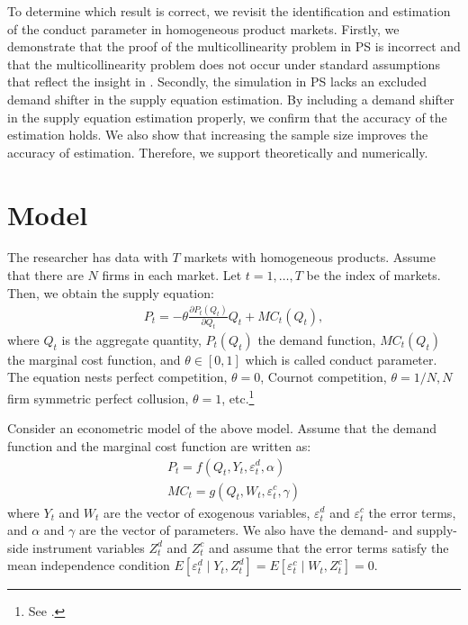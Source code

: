 \documentclass[11pt, a4paper]{article}
\begin{document}
To determine which result is correct, we revisit the identification and estimation of the conduct parameter in homogeneous product markets. 
Firstly, we demonstrate that the proof of the multicollinearity problem in PS is incorrect and that the multicollinearity problem does not occur under standard assumptions that reflect the insight in \cite{bresnahan1982oligopoly}.
Secondly, the simulation in PS lacks an excluded demand shifter in the supply equation estimation. 
By including a demand shifter in the supply equation estimation properly, we confirm that the accuracy of the estimation holds. 
We also show that increasing the sample size improves the accuracy of estimation. 
Therefore, we support \cite{bresnahan1982oligopoly} theoretically and numerically.


\section{Model}
The researcher has data with $T$ markets with homogeneous products.
Assume that there are $N$ firms in each market.
Let $t = 1,\ldots, T$ be the index of markets.
Then, we obtain the supply equation:
\begin{align}
     P_t = -\theta\frac{\partial P_t(Q_{t})}{\partial Q_{t}}Q_{t} + MC_t(Q_{t}),\label{eq:supply_equation}
\end{align}
where $Q_{t}$ is the aggregate quantity, $P_t(Q_{t})$ the demand function, $MC_{t}(Q_{t})$ the marginal cost function, and $\theta\in[0,1]$ which is called conduct parameter. 
The equation nests perfect competition, $\theta=0$, Cournot competition, $\theta=1/N, N$ firm symmetric perfect collusion, $\theta=1$, etc.\footnote{See \cite{bresnahan1982oligopoly}.} 

Consider an econometric model of the above model.
Assume that the demand function and the marginal cost function are written as: 
\begin{align}
    P_t = f(Q_{t}, Y_t, \varepsilon^{d}_{t}, \alpha) \label{eq:demand}\\
    MC_t = g(Q_{t}, W_{t}, \varepsilon^{c}_{t}, \gamma)\label{eq:marginal_cost}
\end{align}
where $Y_t$ and $W_{t}$ are the vector of exogenous variables, $\varepsilon^{d}_{t}$ and $\varepsilon^{c}_{t}$ the error terms, and $\alpha$ and $\gamma$ are the vector of parameters.
We also have the demand- and supply-side instrument variables $Z^{d}_{t}$ and $Z^{c}_{t}$ and assume that the error terms satisfy the mean independence condition $E[\varepsilon^{d}_{t}\mid Y_t, Z^{d}_{t}] = E[\varepsilon^{c}_{t} \mid W_{t}, Z^{c}_{t}] =0$.
\end{document}
